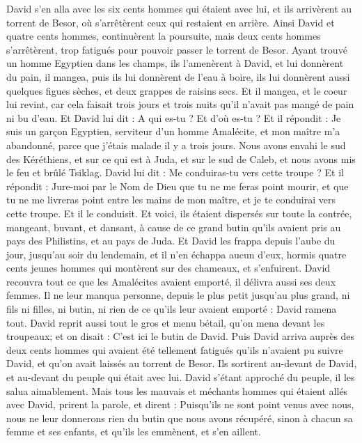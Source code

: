 \begin{multicols}{2}
David s'en alla avec les six cents hommes qui étaient avec lui, et ils arrivèrent au torrent de Besor, où s'arrêtèrent ceux qui restaient en arrière.
Ainsi David et quatre cents hommes, continuèrent la poursuite, mais deux cents hommes s'arrêtèrent, trop fatigués pour pouvoir passer le torrent de Besor.
Ayant trouvé un homme Egyptien dans les champs, ils l'amenèrent à David, et lui donnèrent du pain, il mangea, puis ils lui donnèrent de l'eau à boire,
ils lui donnèrent aussi quelques figues sèches, et deux grappes de raisins secs. Et il mangea, et le coeur lui revint, car cela faisait trois jours et trois nuits qu'il n'avait pas mangé de pain ni bu d'eau.
Et David lui dit : A qui es-tu ? Et d'où es-tu ? Et il répondit : Je suis un garçon Egyptien, serviteur d'un homme Amalécite, et mon maître m'a abandonné, parce que j'étais malade il y a trois jours.
Nous avons envahi le sud des Kéréthiens, et sur ce qui est à Juda, et sur le sud de Caleb, et nous avons mis le feu et brûlé Tsiklag.
David lui dit : Me conduiras-tu vers cette troupe ? Et il répondit : Jure-moi par le Nom de Dieu que tu ne me feras point mourir, et que tu ne me livreras point entre les mains de mon maître, et je te conduirai vers cette troupe.
Et il le conduisit. Et voici, ils étaient dispersés sur toute la contrée, mangeant, buvant, et dansant, à cause de ce grand butin qu'ils avaient pris au pays des Philistins, et au pays de Juda.
Et David les frappa depuis l'aube du jour, jusqu'au soir du lendemain, et il n'en échappa aucun d'eux, hormis quatre cents jeunes hommes qui montèrent sur des chameaux, et s'enfuirent.
David recouvra tout ce que les Amalécites avaient emporté, il délivra aussi ses deux femmes.
Il ne leur manqua personne, depuis le plus petit jusqu'au plus grand, ni fils ni filles, ni butin, ni rien de ce qu'ils leur avaient emporté : David ramena tout.
David reprit aussi tout le gros et menu bétail, qu'on mena devant les troupeaux; et on disait : C'est ici le butin de David.
Puis David arriva auprès des deux cents hommes qui avaient été tellement fatigués qu'ils n'avaient pu suivre David, et qu'on avait laissés au torrent de Besor. Ils sortirent au-devant de David, et au-devant du peuple qui était avec lui. David s'étant approché du peuple, il les salua aimablement.
Mais tous les mauvais et méchants hommes qui étaient allés avec David, prirent la parole, et dirent : Puisqu'ils ne sont point venus avec nous, nous ne leur donnerons rien du butin que nous avons récupéré, sinon à chacun sa femme et ses enfants, et qu'ils les emmènent, et s'en aillent.

\end{multicols}

